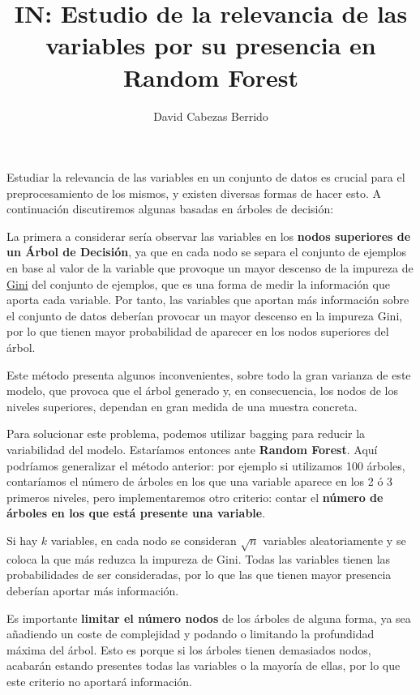 \documentclass{article}
\title{\Huge IN: Estudio de la relevancia de las variables por su presencia en Random Forest \vspace{10mm}}
\author{\huge David Cabezas Berrido}
\begin{document}
\maketitle

Estudiar la relevancia de las variables en un conjunto de datos es
crucial para el preprocesamiento de los mismos, y existen diversas
formas de hacer esto. A continuación discutiremos algunas basadas en
árboles de decisión:

La primera a considerar sería observar las variables en los
\textbf{nodos superiores de un Árbol de Decisión}, ya que en cada nodo
se separa el conjunto de ejemplos en base al valor de la variable que
provoque un mayor descenso de la impureza de
\href{https://es.wikipedia.org/wiki/Aprendizaje_basado_en_%C3%A1rboles_de_decisi%C3%B3n#Impureza_de_Gini}{Gini}
  del conjunto de ejemplos, que es una forma de medir la información
  que aporta cada variable. Por tanto, las variables que aportan más
  información sobre el conjunto de datos deberían provocar un mayor
  descenso en la impureza Gini, por lo que tienen mayor probabilidad
  de aparecer en los nodos superiores del árbol.

  Este método presenta algunos inconvenientes, sobre todo la gran
  varianza de este modelo, que provoca que el árbol generado y, en
  consecuencia, los nodos de los niveles superiores, dependan en gran
  medida de una muestra concreta.

  Para solucionar este problema, podemos utilizar bagging para reducir
  la variabilidad del modelo. Estaríamos entonces ante \textbf{Random
    Forest}. Aquí podríamos generalizar el método anterior: por
  ejemplo si utilizamos 100 árboles, contaríamos el número de árboles
  en los que una variable aparece en los 2 ó 3 primeros niveles, pero
  implementaremos otro criterio: contar el \textbf{número de árboles
    en los que está presente una variable}.

  Si hay $k$ variables, en cada nodo se consideran $\sqrt{n}$
  variables aleatoriamente y se coloca la que más reduzca la impureza
  de Gini. Todas las variables tienen las probabilidades de ser
  consideradas, por lo que las que tienen mayor presencia deberían
  aportar más información.

  Es importante \textbf{limitar el número nodos} de los árboles de
  alguna forma, ya sea añadiendo un coste de complejidad y podando o
  limitando la profundidad máxima del árbol. Esto es porque si los
  árboles tienen demasiados nodos, acabarán estando presentes todas
  las variables o la mayoría de ellas, por lo que este criterio no
  aportará información.
\end{document}
